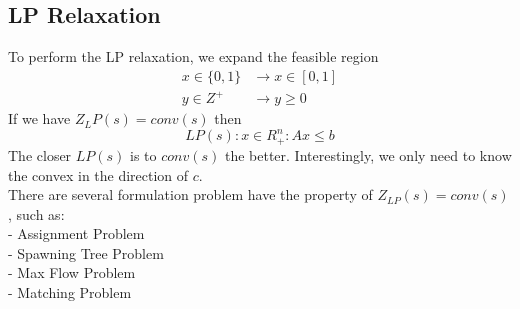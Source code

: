 			\subsection{LP Relaxation}
				To perform the LP relaxation, we expand the feasible region
				\begin{align}
					x \in \{0,1\} & \rightarrow x\in [0, 1]  \\
					y\in Z^+ & \rightarrow y \ge 0 
				\end{align}
				If we have $Z_LP(s) = conv(s)$ then
				\begin{equation} LP(s): {x\in R_+^n: Ax\le b}\end{equation}
				The closer $LP(s)$ is to $conv(s)$ the better. Interestingly, we only need to know the convex in the direction of $c$.\\
				There are several formulation problem have the property of $Z_{LP}(s) = conv(s)$, such as:\\
				\indent- Assignment Problem\\
				\indent- Spawning Tree Problem\\
				\indent- Max Flow Problem\\
				\indent- Matching Problem

